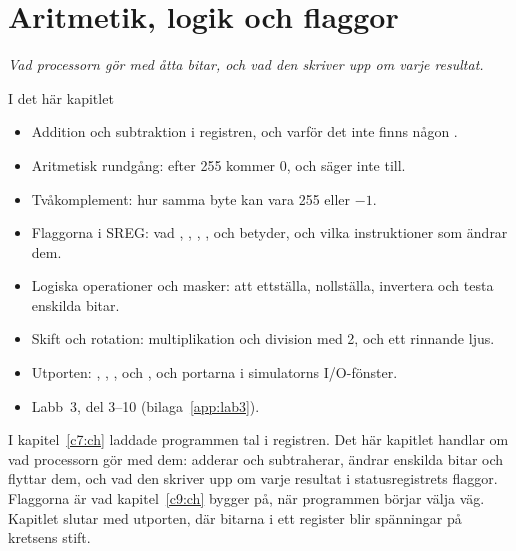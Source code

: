 
\chapter{Aritmetik, logik och flaggor}
\label{c8:ch}

{\large\itshape Vad processorn gör med åtta bitar, och vad den skriver upp om varje resultat.\par}

\begin{chapterbox}{I det här kapitlet}
\begin{itemize}
  \item Addition och subtraktion i registren, och varför det inte finns någon .
  \item Aritmetisk rundgång: efter 255 kommer 0, och  säger inte till.
  \item Tvåkomplement: hur samma byte kan vara 255 eller $-1$.
  \item Flaggorna i SREG: vad , , , ,  och 
    betyder, och vilka instruktioner som ändrar dem.
  \item Logiska operationer och masker: att ettställa, nollställa, invertera och testa enskilda
    bitar.
  \item Skift och rotation: multiplikation och division med 2, och ett rinnande ljus.
  \item Utporten: , , ,  och , och portarna i
    simulatorns I/O-fönster.
  \item Labb~3, del 3--10 (bilaga~\ref{app:lab3}).
\end{itemize}
\end{chapterbox}

I kapitel~\ref{c7:ch} laddade programmen tal i registren. Det här kapitlet handlar om vad
processorn gör med dem: adderar och subtraherar, ändrar enskilda bitar och flyttar dem, och vad den
skriver upp om varje resultat i statusregistrets flaggor. Flaggorna är vad kapitel~\ref{c9:ch}
bygger på, när programmen börjar välja väg. Kapitlet slutar med utporten, där bitarna i ett
register blir spänningar på kretsens stift.

